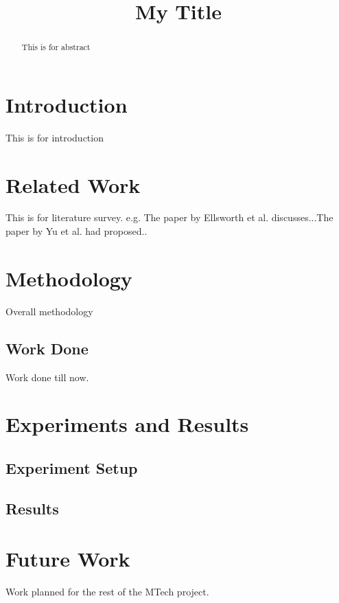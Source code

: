 \documentclass[conference]{IEEEtran}
\begin{document}
\title{My Title}

\author{
}

\maketitle

\begin{abstract}

This is for abstract

\end{abstract}

\section{Introduction}
\label{intro}

This is for introduction

\section{Related Work}

This is for literature survey. e.g. The paper by Ellsworth et al.\cite{ellsworth-concurrentvis-tvcg2006} discusses...The paper by Yu et al.\cite{yu-parvis-sc2004} had proposed..

\section{Methodology}

Overall methodology

\subsection{Work Done}

Work done till now.

\section{Experiments and Results}

\subsection{Experiment Setup}

\subsection{Results}

\section{Future Work}

Work planned for the rest of the MTech project.



\end{document}
